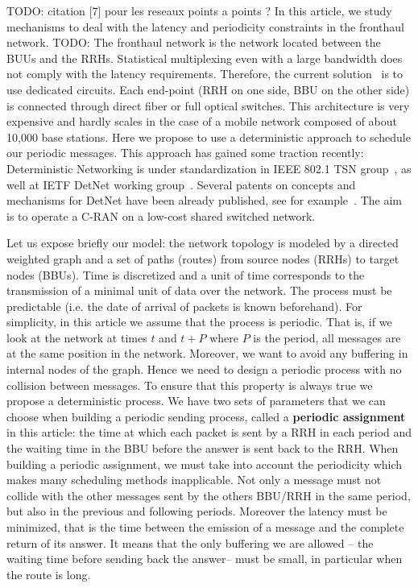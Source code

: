 \documentclass[a4paper,10pt]{article}
\newcommand{\todo}[1]{{\color{red} TODO: {#1}}}
\begin{document}
\todo{citation [7] pour les reseaux points a points ?}
 In this article, we study mechanisms to deal with the latency and periodicity constraints in the fronthaul network. \todo{The fronthaul network is the network located between the BUUs and the RRHs.}
 Statistical multiplexing even with a large bandwidth does not comply with the latency requirements. Therefore, the current solution~\cite{pizzinat2015things,tayq2017real} is to use dedicated circuits. Each end-point (RRH on one side, BBU on the other side) is connected through direct fiber or full optical switches. This architecture is very expensive and hardly scales in the case of a mobile network composed of about 10,000 base stations. Here we propose to use a deterministic approach to schedule our periodic messages. This approach has gained some traction recently: Deterministic Networking is under standardization in IEEE 802.1 TSN group~\cite{finn-detnet-architecture-08}, as well at IETF DetNet working group~\cite{ieee802}. Several patents on concepts and mechanisms for DetNet have been already published, see for example~\cite{howe2005time,leclerc2016transmission}. The aim is to operate a C-RAN on a low-cost shared switched network.
 
Let us expose briefly our model: the network topology is modeled by a directed weighted graph and a set of paths (routes) from source nodes (RRHs) to target nodes (BBUs). Time is discretized and a unit of time corresponds to the transmission of a minimal unit of data over the network. The process must be  predictable (i.e. the date of arrival of packets is known beforehand). For simplicity, in this article we assume that the process is periodic. That is, if we look at the network at times $t$ and $t+P$ where $P$ is the period, all messages are at the same position in the network. Moreover, we want to avoid any  buffering in internal nodes of the graph. Hence we need to design a periodic process with no collision between messages. To ensure that this property is always true we propose a deterministic process.  We have two sets of parameters that we can choose when building a periodic sending process, called a \textbf{periodic assignment} in this article: the time at which each packet is sent by a RRH in each period and the waiting time in the BBU before the answer is sent back to the RRH. When building a periodic assignment, we must take into account the periodicity which makes many scheduling methods inapplicable. Not only a message must not collide with the other messages sent by the others BBU/RRH in the same period, but also in the previous and following periods. Moreover the latency must be minimized, that is the time 
 between the emission of a message and the complete return of its answer. It means that the only buffering we are allowed -- the waiting time before sending back the answer-- must be small, in particular when the route is long.
   
\end{document}
